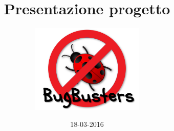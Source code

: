 \documentclass[]{beamer}
\title{Presentazione progetto}
\author[BugBuster]{\includegraphics[width=0.4\textwidth]{logo.png}}
\date{18-03-2016}
\institute{Progetto MaaS}
\begin{document}
\graphicspath{ {res/img/} }



\end{document}
